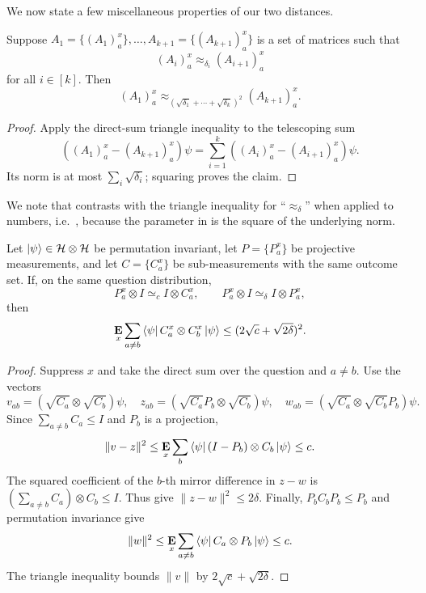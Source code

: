 \documentclass[11pt]{article}
\theoremstyle{definition}
\newcommand{\E}{\mathop{\bf E\/}}
\newcommand{\calH}{\mathcal{H}}
\begin{document}
We now state a few miscellaneous properties of our two distances.

\begin{proposition}
\label{prop:triangle-inequality-for-approx_delta}
Suppose $A_1 = \{(A_1)^x_a\}, \ldots, A_{k+1} = \{(A_{k+1})^x_a\}$ is a set of matrices such that
\begin{equation*}
(A_i)^x_a \approx_{\delta_i} (A_{i+1})^x_a
\end{equation*}
for all $i \in [k]$. Then
\begin{equation*}
(A_1)^x_a \approx_{(\sqrt{\delta_1}+\cdots+\sqrt{\delta_k})^2} (A_{k+1})^x_a.
\end{equation*}
\end{proposition}
\begin{proof}
Apply the direct-sum triangle inequality to the telescoping sum
\[
 ((A_1)^x_a-(A_{k+1})^x_a)\psi
 =\sum_{i=1}^k((A_i)^x_a-(A_{i+1})^x_a)\psi.
\]
Its norm is at most $\sum_i\sqrt{\delta_i}$; squaring proves the claim.
\end{proof}

We note that 
contrasts with the triangle inequality for ``$\approx_{\delta}$'' when applied to numbers,
i.e.\ , because the parameter in
 is the square of the underlying norm.

\begin{lemma}
\label{lem:projective-bridge}
Let $\ket\psi\in\calH\otimes\calH$ be permutation invariant, let
$P=\{P_a^x\}$ be projective measurements, and let $C=\{C_a^x\}$ be
sub-measurements with the same outcome set.  If, on the same question
distribution,
\[
 P_a^x\otimes I\simeq_c I\otimes C_a^x,
 \qquad P_a^x\otimes I\simeq_\delta I\otimes P_a^x,
\]
then
\begin{equation}\label{eq:self-improvement-disagreement}
 \E_x\sum_{a\ne b}\bra\psi C_a^x\otimes C_b^x\ket\psi
 \leq(2\sqrt c+\sqrt{2\delta})^2.
\end{equation}
\end{lemma}
\begin{proof}
Suppress $x$ and take the direct sum over the question and $a\ne b$.
Use the vectors
\[
 v_{ab}=(\sqrt{C_a}\otimes\sqrt{C_b})\psi,\quad
 z_{ab}=(\sqrt{C_a}P_b\otimes\sqrt{C_b})\psi,\quad
 w_{ab}=(\sqrt{C_a}\otimes\sqrt{C_b}P_b)\psi.
\]
Since $\sum_{a\ne b}C_a\leq I$ and $P_b$ is a projection,
\[
 \|v-z\|^2\leq\E_x\sum_b
 \bra\psi(I-P_b)\otimes C_b\ket\psi\leq c.
\]
The squared coefficient of the $b$-th mirror difference in $z-w$ is
$(\sum_{a\ne b}C_a)\otimes C_b\leq I$.  Thus
 give
$\|z-w\|^2\leq2\delta$.
Finally, $P_bC_bP_b\leq P_b$ and permutation invariance give
\[
 \|w\|^2\leq\E_x\sum_{a\ne b}
 \bra\psi C_a\otimes P_b\ket\psi\leq c.
\]
The triangle inequality bounds $\|v\|$ by $2\sqrt c+\sqrt{2\delta}$.
\end{proof}
\end{document}
